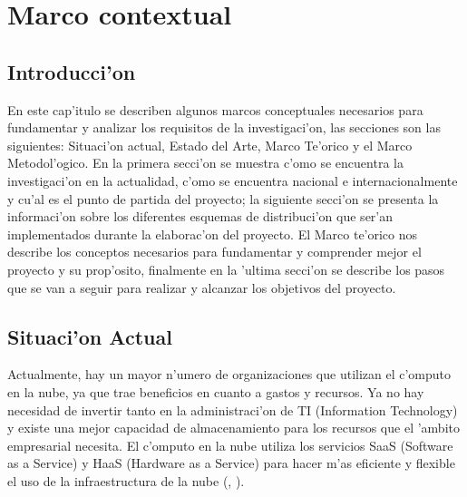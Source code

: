 
\chapter{Marco contextual}
\section*{Introducci'on}

En este cap'itulo se describen algunos marcos conceptuales necesarios para fundamentar y analizar los requisitos de la investigaci'on, las secciones son las siguientes: Situaci'on actual, Estado del Arte, Marco Te'orico y el Marco Metodol'ogico. En la primera secci'on se muestra c'omo se encuentra la investigaci'on en la actualidad, c'omo se encuentra nacional e internacionalmente y cu'al es el punto de partida del proyecto; la siguiente secci'on se presenta la informaci'on sobre los diferentes esquemas de distribuci'on que ser'an implementados durante la elaborac'on del proyecto. El Marco te'orico nos describe los conceptos necesarios para fundamentar y comprender mejor el proyecto y su prop'osito, finalmente en la 'ultima secci'on se describe los pasos que se van a seguir para realizar y alcanzar los objetivos del proyecto.

\newpage


\section{Situaci'on Actual}

Actualmente, hay un mayor n'umero de organizaciones que utilizan el c'omputo en la nube, ya que trae beneficios en cuanto a gastos y recursos. Ya no hay necesidad de invertir tanto en la administraci'on de TI (Information Technology) y existe una mejor capacidad de almacenamiento para los recursos que el 'ambito empresarial necesita.
El c'omputo en la nube utiliza los servicios SaaS (Software as a Service) y HaaS (Hardware as a Service) para hacer m'as eficiente y flexible el uso de la infraestructura de la nube (\citeauthor{mariscal2013computo}, \citeyear{mariscal2013computo}). 

